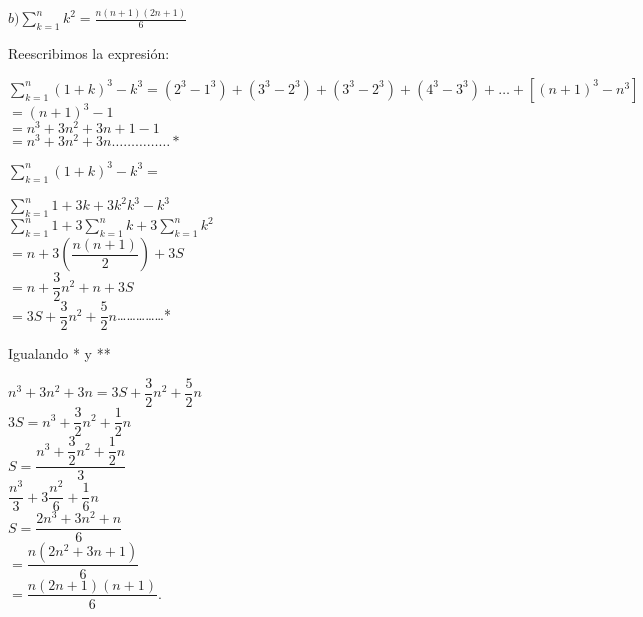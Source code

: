 \documentclass[12pt,a4paper,scrartcl]{article}
\begin{document}
{\newpage
\begin{flushleft}
$\displaystyle
b)  \sum_{k=1}^{n}k^{2} = \frac{n(n+1)(2n+1)}{6}$
\end{flushleft}
Reescribimos la expresi\'on:
\begin{center}
$\displaystyle
\sum_{k=1}^{n}(1+k)^3-k^3 = (2^3-1^3)+(3^3-2^3)+(3^3-2^3)+(4^3-3^3)+\ldots+[(n+1)^3-n^3]$
$=(n+1)^3-1$\\
$=n^3+3n^2+3n+1-1$\\
$=n^3+3n^2+3n\ldots\ldots\ldots\ldots\ldots *$
\end{center}
$\displaystyle
\sum_{k=1}^{n}(1+k)^3-k^3 =
$ \begin{center}
$\displaystyle
\sum_{k=1}^{n}1+3k+3k^2k^3-k^3$\\$
\displaystyle
\sum_{k=1}^{n}1+3\sum_{k=1}^{n}k+3\sum_{k=1}^{n}k^2$\\\vspace{1em}
$=n+3(\dfrac{n(n+1)}{2})+3S$\\\vspace{1em}
$=n+\dfrac{3}{2}n^2+n+3S$\\\vspace{1em}
$=3S+\dfrac{3}{2}n^2+\dfrac{5}{2}n$\ldots\ldots\ldots\ldots\ldots**
\end{center}
Igualando * y **\\
\begin{center}
$n^3+3n^2+3n=3S+\dfrac{3}{2}n^2+\dfrac{5}{2}n$\\\vspace{1em}
$3S=n^3+\dfrac{3}{2}n^2+\dfrac{1}{2}n$\\\vspace{1em}
$S=\dfrac{n^3+\dfrac{3}{2}n^2+\dfrac{1}{2}n}{3}$\\\vspace{1em}
$\dfrac{n^3}{3}+3\dfrac{n^2}{6}+\dfrac{1}{6}n$\\\vspace{1em}
$S=\dfrac{2n^3+3n^2+n}{6}$\\\vspace{1em}
$=\dfrac{n(2n^2+3n+1)}{6}$\\\vspace{1em}
$=\dfrac{n(2n+1)(n+1)}{6}$.
\end{center}

}
\end{document}
